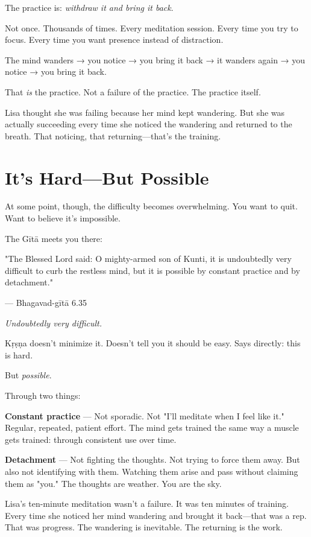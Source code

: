 \documentclass[11pt,twoside]{book}
\begin{document}
The practice is: \textit{withdraw it and bring it back}.

Not once. Thousands of times. Every meditation session. Every time you try to focus. Every time you want presence instead of distraction.

The mind wanders → you notice → you bring it back → it wanders again → you notice → you bring it back.

That \textit{is} the practice. Not a failure of the practice. The practice itself.

Lisa thought she was failing because her mind kept wandering. But she was actually succeeding every time she noticed the wandering and returned to the breath. That noticing, that returning—that's the training.

\section*{It's Hard—But Possible}

At some point, though, the difficulty becomes overwhelming. You want to quit. Want to believe it's impossible.

The Gītā meets you there:

\begin{pullquote}
"The Blessed Lord said: O mighty-armed son of Kunti, it is undoubtedly very difficult to curb the restless mind, but it is possible by constant practice and by detachment."

--- Bhagavad-gītā 6.35
\end{pullquote}

\textit{Undoubtedly very difficult.}

Kṛṣṇa doesn't minimize it. Doesn't tell you it should be easy. Says directly: this is hard.

But \textit{possible}.

Through two things:

\textbf{\textbf{Constant practice}} — Not sporadic. Not "I'll meditate when I feel like it." Regular, repeated, patient effort. The mind gets trained the same way a muscle gets trained: through consistent use over time.

\textbf{\textbf{Detachment}} — Not fighting the thoughts. Not trying to force them away. But also not identifying with them. Watching them arise and pass without claiming them as "you." The thoughts are weather. You are the sky.

Lisa's ten-minute meditation wasn't a failure. It was ten minutes of training. Every time she noticed her mind wandering and brought it back—that was a rep. That was progress. The wandering is inevitable. The returning is the work.
\end{document}
